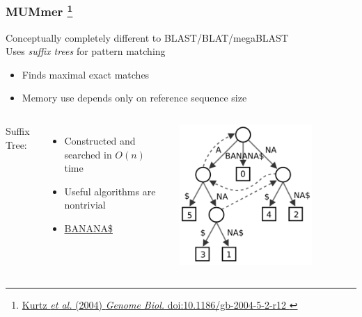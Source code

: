 %
\begin{frame}
  \frametitle{MUMmer
  \footnote{\tiny{\href{http://dx.doi.org/10.1186/gb-2004-5-2-r12
}{Kurtz \textit{et al.} (2004) \textit{Genome Biol.} doi:10.1186/gb-2004-5-2-r12
}}}
  }
  Conceptually completely different to BLAST/BLAT/megaBLAST \\
  \textcolor{RawSienna}{Uses \textit{suffix trees} for pattern matching}
  \begin{itemize}
    \item \textcolor{hutton_green}{Finds maximal exact matches}
    \item \textcolor{hutton_blue}{Memory use depends only on reference sequence size}
  \end{itemize}
  \begin{columns}[T] 
      \textcolor{hutton_purple}{Suffix Tree:}
      \begin{itemize}
        \item Constructed and searched in $O(n)$ time
        \item Useful algorithms are nontrivial
        \item \url{BANANA$}
      \end{itemize}
      \includegraphics[width=0.75\textwidth]{images/suffix_tree}
  \end{columns}    
\end{frame}

